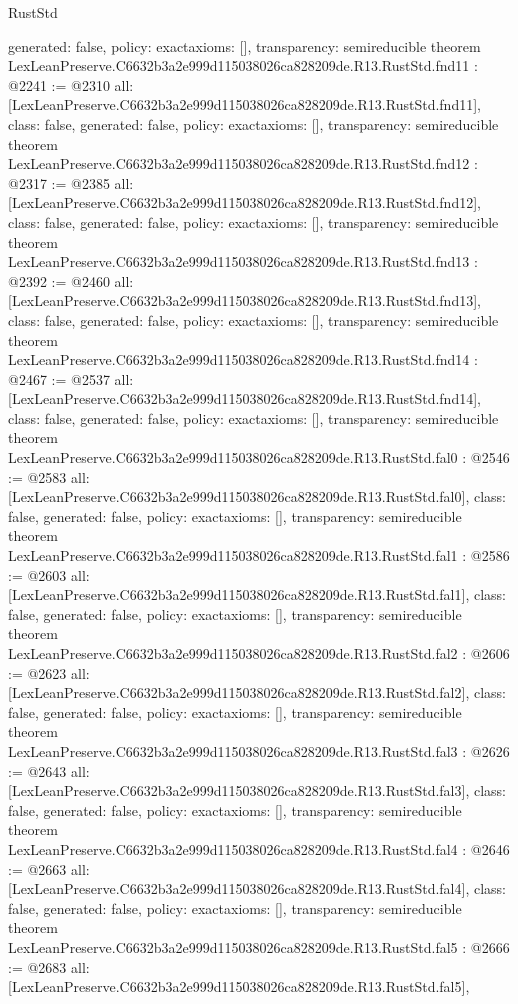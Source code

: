 \begin{lexlean}{RustStd}
\begin{coremodule}
{  generated: false,
  policy: exact{axioms: []},
  transparency: semireducible
}
theorem LexLeanPreserve.C6632b3a2e999d115038026ca828209de.R13.RustStd.fnd11 : @2241 := @2310 {
  all: [LexLeanPreserve.C6632b3a2e999d115038026ca828209de.R13.RustStd.fnd11],
  class: false,
  generated: false,
  policy: exact{axioms: []},
  transparency: semireducible
}
theorem LexLeanPreserve.C6632b3a2e999d115038026ca828209de.R13.RustStd.fnd12 : @2317 := @2385 {
  all: [LexLeanPreserve.C6632b3a2e999d115038026ca828209de.R13.RustStd.fnd12],
  class: false,
  generated: false,
  policy: exact{axioms: []},
  transparency: semireducible
}
theorem LexLeanPreserve.C6632b3a2e999d115038026ca828209de.R13.RustStd.fnd13 : @2392 := @2460 {
  all: [LexLeanPreserve.C6632b3a2e999d115038026ca828209de.R13.RustStd.fnd13],
  class: false,
  generated: false,
  policy: exact{axioms: []},
  transparency: semireducible
}
theorem LexLeanPreserve.C6632b3a2e999d115038026ca828209de.R13.RustStd.fnd14 : @2467 := @2537 {
  all: [LexLeanPreserve.C6632b3a2e999d115038026ca828209de.R13.RustStd.fnd14],
  class: false,
  generated: false,
  policy: exact{axioms: []},
  transparency: semireducible
}
theorem LexLeanPreserve.C6632b3a2e999d115038026ca828209de.R13.RustStd.fal0 : @2546 := @2583 {
  all: [LexLeanPreserve.C6632b3a2e999d115038026ca828209de.R13.RustStd.fal0],
  class: false,
  generated: false,
  policy: exact{axioms: []},
  transparency: semireducible
}
theorem LexLeanPreserve.C6632b3a2e999d115038026ca828209de.R13.RustStd.fal1 : @2586 := @2603 {
  all: [LexLeanPreserve.C6632b3a2e999d115038026ca828209de.R13.RustStd.fal1],
  class: false,
  generated: false,
  policy: exact{axioms: []},
  transparency: semireducible
}
theorem LexLeanPreserve.C6632b3a2e999d115038026ca828209de.R13.RustStd.fal2 : @2606 := @2623 {
  all: [LexLeanPreserve.C6632b3a2e999d115038026ca828209de.R13.RustStd.fal2],
  class: false,
  generated: false,
  policy: exact{axioms: []},
  transparency: semireducible
}
theorem LexLeanPreserve.C6632b3a2e999d115038026ca828209de.R13.RustStd.fal3 : @2626 := @2643 {
  all: [LexLeanPreserve.C6632b3a2e999d115038026ca828209de.R13.RustStd.fal3],
  class: false,
  generated: false,
  policy: exact{axioms: []},
  transparency: semireducible
}
theorem LexLeanPreserve.C6632b3a2e999d115038026ca828209de.R13.RustStd.fal4 : @2646 := @2663 {
  all: [LexLeanPreserve.C6632b3a2e999d115038026ca828209de.R13.RustStd.fal4],
  class: false,
  generated: false,
  policy: exact{axioms: []},
  transparency: semireducible
}
theorem LexLeanPreserve.C6632b3a2e999d115038026ca828209de.R13.RustStd.fal5 : @2666 := @2683 {
  all: [LexLeanPreserve.C6632b3a2e999d115038026ca828209de.R13.RustStd.fal5],
}
\end{coremodule}
\end{lexlean}
